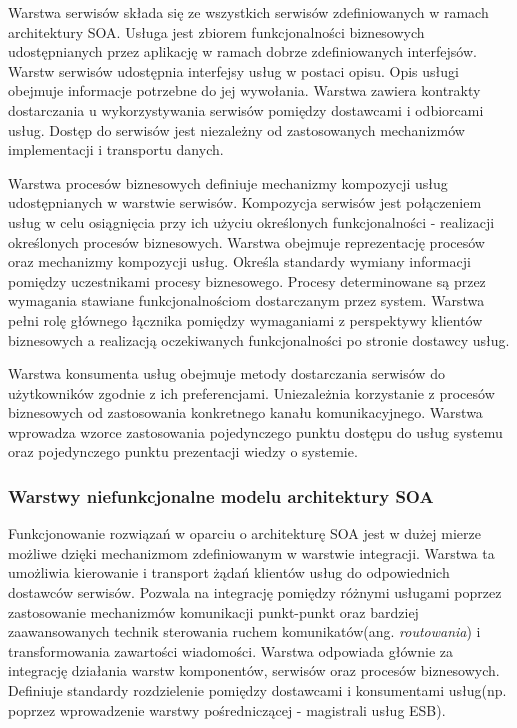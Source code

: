 			Warstwa serwisów składa się ze wszystkich serwisów zdefiniowanych w ramach architektury SOA. Usługa jest zbiorem funkcjonalności biznesowych udostępnianych przez aplikację w ramach dobrze zdefiniowanych interfejsów. Warstw serwisów udostępnia interfejsy usług w postaci opisu. Opis usługi obejmuje informacje potrzebne do jej wywołania. Warstwa zawiera kontrakty dostarczania u wykorzystywania serwisów pomiędzy dostawcami i odbiorcami usług. Dostęp do serwisów jest niezależny od zastosowanych mechanizmów implementacji i transportu danych. 

			Warstwa procesów biznesowych definiuje mechanizmy kompozycji usług udostępnianych w warstwie serwisów. Kompozycja serwisów jest połączeniem usług w celu osiągnięcia przy ich użyciu określonych funkcjonalności - realizacji określonych procesów biznesowych. Warstwa obejmuje reprezentację procesów oraz mechanizmy kompozycji usług. Określa standardy wymiany informacji pomiędzy uczestnikami procesy biznesowego. Procesy determinowane są przez wymagania stawiane funkcjonalnościom dostarczanym przez system. Warstwa pełni rolę głównego łącznika pomiędzy wymaganiami z perspektywy klientów biznesowych a realizacją oczekiwanych funkcjonalności po stronie dostawcy usług.

			Warstwa konsumenta usług obejmuje metody dostarczania serwisów do użytkowników zgodnie z ich preferencjami. Uniezależnia korzystanie z procesów biznesowych od zastosowania konkretnego kanału komunikacyjnego. Warstwa wprowadza wzorce zastosowania pojedynczego punktu dostępu do usług systemu oraz pojedynczego punktu prezentacji wiedzy o systemie.

		\subsubsection{Warstwy niefunkcjonalne modelu architektury SOA}

			Funkcjonowanie rozwiązań w oparciu o architekturę SOA jest w dużej mierze możliwe dzięki mechanizmom zdefiniowanym w warstwie integracji. Warstwa ta umożliwia kierowanie i transport żądań klientów usług do odpowiednich dostawców serwisów. Pozwala na integrację pomiędzy różnymi usługami poprzez zastosowanie mechanizmów komunikacji punkt-punkt oraz bardziej zaawansowanych technik sterowania ruchem komunikatów(ang. \textit{routowania}) i transformowania zawartości wiadomości. Warstwa odpowiada głównie za integrację działania warstw komponentów, serwisów oraz procesów biznesowych. Definiuje standardy rozdzielenie pomiędzy dostawcami i konsumentami usług(np. poprzez wprowadzenie warstwy pośredniczącej - magistrali usług ESB)\cite{Arsanjani07}.

